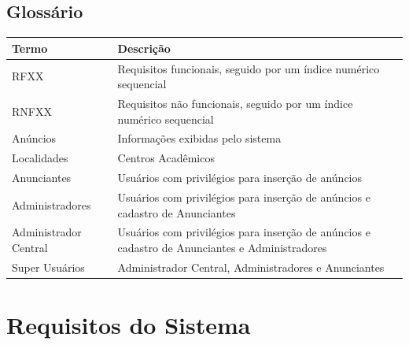 \documentclass[a4paper, 12pt]{article}
\begin{document}
\subsection{Glossário}
\begin{table}[ht]
	\centering

	\begin{tabular}{p{3cm}p{12cm}}
		\hline
		\cellcolor{gray}Termo&\cellcolor{gray}Descrição  \\
		\hline
		RFXX&Requisitos funcionais, seguido por um índice numérico sequencial\\
		RNFXX&Requisitos não funcionais, seguido por um índice numérico sequencial\\
        An\'{u}ncios&Informa\c{c}\~{o}es exibidas pelo sistema\\
        Localidades&Centros Acad\^{e}micos\\
        Anunciantes&Usu\'{a}rios com privil\'{e}gios para inser\c{c}\~{a}o de an\'{u}ncios\\
        Administradores&Usu\'{a}rios com privil\'{e}gios para inser\c{c}\~{a}o de an\'{u}ncios e cadastro de Anunciantes\\
        Administrador Central&Usu\'{a}rios com privil\'{e}gios para inser\c{c}\~{a}o de an\'{u}ncios e cadastro de Anunciantes e Administradores\\
        Super Usu\'{a}rios&Administrador Central, Administradores e Anunciantes\\
		\hline
	\end{tabular}
\end{table}
\newpage
\section{Requisitos do Sistema}
\end{document}
